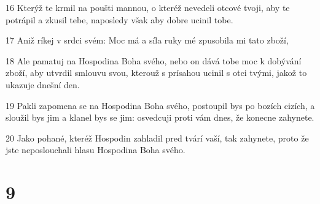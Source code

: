 \par 16 Kterýž te krmil na poušti mannou, o kteréž nevedeli otcové tvoji, aby te potrápil a zkusil tebe, naposledy však aby dobre ucinil tobe.
\par 17 Aniž ríkej v srdci svém: Moc má a síla ruky mé zpusobila mi tato zboží,
\par 18 Ale pamatuj na Hospodina Boha svého, nebo on dává tobe moc k dobývání zboží, aby utvrdil smlouvu svou, kterouž s prísahou ucinil s otci tvými, jakož to ukazuje dnešní den.
\par 19 Pakli zapomena se na Hospodina Boha svého, postoupil bys po bozích cizích, a sloužil bys jim a klanel bys se jim: osvedcuji proti vám dnes, že konecne zahynete.
\par 20 Jako pohané, kteréž Hospodin zahladil pred tvárí vaší, tak zahynete, proto že jste neposlouchali hlasu Hospodina Boha svého.

\chapter{9}

